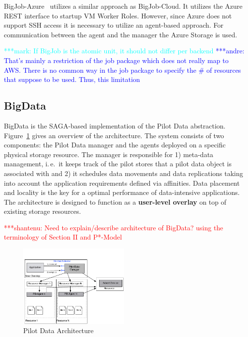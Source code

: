 \documentclass[conference,final]{IEEEtran}
\newcommand{\jhanote}[1]{ {\textcolor{red} { ***shantenu: #1 }}}
\newcommand{\alnote}[1]{ {\textcolor{blue} { ***andre: #1 }}}
\newcommand{\msnote}[1]{ {\textcolor{cyan} { ***mark: #1 }}}
\newcommand{\alnote}[1]{}
\newcommand{\jhanote}[1]{}
\begin{document}
BigJob-Azure~\cite{10.1109/CloudCom.2010.85} utilizes a similar approach as
BigJob-Cloud. It utilizes the Azure REST interface to startup VM Worker Roles.
However, since Azure does not support SSH access it is necessary to utilize an
agent-based approach. For communication between the agent and the manager the
Azure Storage is used.

\msnote{If BigJob is the atomic unit, it should not differ per
  backend}\alnote{That's mainly a restriction of the job package which
  does not really map to AWS. There is no common way in the job
  package to specify the \# of resources that suppose to be
  used. Thus, this limitation}


\subsection{BigData}


BigData is the SAGA-based implementation of the Pilot Data abstraction.
Figure~\ref{fig:figures_distributed_pilot_job} gives an overview of the
architecture. The system consists of two components: the Pilot Data manager and
the agents deployed on a specific physical storage resource. The manager is
responsible for 1) meta-data management, i.\,e.\ it keeps track of the pilot
stores that a pilot data object is associated with and 2) it schedules data
movements and data replications taking into account the application requirements 
defined via affinities. Data placement and locality is the key for a optimal 
performance of data-intensive applications. The architecture is designed to 
function as a \textbf{user-level overlay} on top of existing storage resources.


\jhanote{Need to explain/describe architecture of BigData? using the
  terminology of Section II and P*-Model}

\begin{figure}[htbp]
    \centering
        \includegraphics[width=0.49\textwidth]{figures/pilot-data-manager.pdf}
    \caption{Pilot Data Architecture}
    \label{fig:figures_distributed_pilot_job}
\end{figure}
\end{document}
